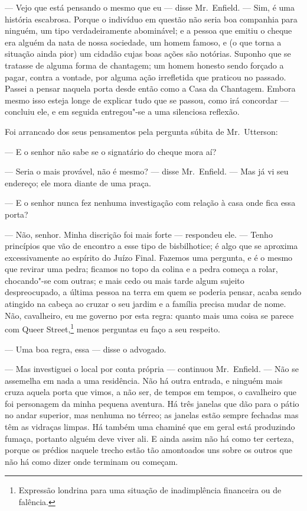 --- Vejo que está pensando o mesmo que eu --- disse Mr.~Enfield. --- Sim, é
uma história escabrosa.  Porque o indivíduo em questão não seria boa
companhia para ninguém, um tipo verdadeiramente abominável; e a pessoa
que emitiu o cheque era alguém da nata de nossa sociedade, um homem
famoso, e (o que torna a situação ainda pior) um cidadão cujas boas
ações são notórias.  Suponho que se tratasse de alguma forma de
chantagem; um homem honesto sendo forçado a pagar, contra a vontade,
por alguma ação irrefletida que praticou no passado.  Passei a pensar
naquela porta desde então como a Casa da Chantagem.  Embora mesmo isso
esteja longe de explicar tudo que se passou, como irá concordar --- 
concluiu ele, e em seguida entregou"-se a uma silenciosa reflexão.

Foi arrancado dos seus pensamentos pela pergunta súbita de Mr.~Utterson:

--- E o senhor não sabe se o signatário do cheque mora aí?

--- Seria o mais provável, não é mesmo? --- disse Mr.~Enfield. --- Mas já vi
seu endereço; ele mora diante de uma praça. 

--- E o senhor nunca fez nenhuma investigação com relação à casa onde fica
essa porta?

--- Não, senhor.  Minha discrição foi mais forte --- respondeu ele. ---
Tenho princípios que vão de encontro a esse tipo de bisbilhotice; é
algo que se aproxima excessivamente ao espírito do Juízo Final. 
Fazemos uma pergunta, e é o mesmo que revirar uma pedra; ficamos no
topo da colina e a pedra começa a rolar, chocando"-se com outras; e mais
cedo ou mais tarde algum sujeito despreocupado, a última pessoa na
terra em quem se poderia pensar, acaba sendo atingido na cabeça ao
cruzar o seu jardim e a família precisa mudar de nome.  Não,
cavalheiro, eu me governo por esta regra: quanto mais uma coisa se
parece com Queer Street,\footnote{ Expressão londrina 
para uma situação de inadimplência financeira ou de falência.} menos      
perguntas eu faço a seu respeito.

--- Uma boa regra, essa --- disse o advogado. 

--- Mas investiguei o local por conta própria --- continuou Mr.~Enfield. ---
Não se assemelha em nada a uma residência.  Não há outra entrada, e
ninguém mais cruza aquela porta que vimos, a não ser, de tempos em
tempos, o cavalheiro que foi personagem da minha pequena aventura.  Há
três janelas que dão para o pátio no andar superior, mas nenhuma no
térreo; as janelas estão sempre fechadas mas têm as vidraças limpas. 
Há também uma chaminé que em geral está produzindo fumaça, portanto
alguém deve viver ali.  E ainda assim não há como ter certeza, porque
os prédios naquele trecho estão tão amontoados uns sobre os outros que
não há como dizer onde terminam ou começam.

